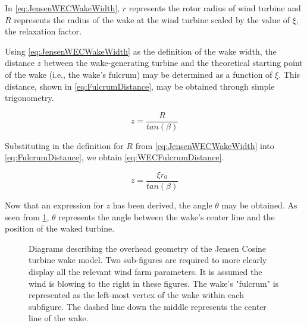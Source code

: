 \documentclass[a4paper]{jpconf}
\begin{document}
In \cref{eq:JensenWECWakeWidth}, $r$ represents the rotor radius of wind turbine and $R$ represents the radius of the wake at the wind turbine scaled by the value of $\xi$, the relaxation factor.

Using \cref{eq:JensenWECWakeWidth} as the definition of the wake width, the distance $z$ between the wake-generating turbine and the theoretical starting point of the wake (i.e., the wake's fulcrum) may be determined as a function of $\xi$. This distance, shown in \cref{eq:FulcrumDistance}, may be obtained through simple trigonometry.

\begin{equation}
    z = \frac{R}{tan(\beta)}
    \label{eq:FulcrumDistance}
\end{equation}

Substituting in the definition for $R$ from \cref{eq:JensenWECWakeWidth} into \cref{eq:FulcrumDistance}, we obtain \cref{eq:WECFulcrumDistance}.

\begin{equation}
    z = \frac{\xi r_0}{tan(\beta)}
    \label{eq:WECFulcrumDistance}
\end{equation}

Now that an expression for $z$ has been derived, the angle $\theta$ may be obtained. As seen from \cref{fig:JensenDiagrams}, $\theta$ represents the angle between the wake's center line and the position of the waked turbine.

\begin{figure}[h]
    \centering
    \caption{Diagrams describing the overhead geometry of the Jensen Cosine turbine wake model. Two sub-figures are required to more clearly display all the relevant wind farm parameters. It is assumed the wind is blowing to the right in these figures. The wake's "fulcrum" is represented as the left-most vertex of the wake within each subfigure. The dashed line down the middle represents the center line of the wake.}
    \label{fig:JensenDiagrams}
\end{figure}
\end{document}
